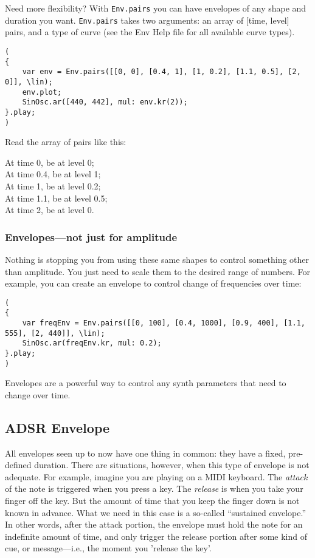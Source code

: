 Need more flexibility? With \texttt{Env.pairs} you can have envelopes of any shape and duration you want. \texttt{Env.pairs} takes two arguments: an array of [time, level] pairs, and a type of curve (see the Env Help file for all available curve types).

 
\begin{lstlisting}[style=SuperCollider-IDE, basicstyle=\scttfamily\footnotesize]
(
{
	var env = Env.pairs([[0, 0], [0.4, 1], [1, 0.2], [1.1, 0.5], [2, 0]], \lin);
	env.plot;
	SinOsc.ar([440, 442], mul: env.kr(2));
}.play;
)
\end{lstlisting}
 

Read the array of pairs like this:
\begin{center}
At time 0, be at level 0;\\
At time 0.4, be at level 1;\\
At time 1, be at level 0.2;\\
At time 1.1, be at level 0.5;\\
At time 2, be at level 0.
\end{center}

\subsubsection{Envelopes---not just for amplitude}

Nothing is stopping you from using these same shapes to control something other than amplitude. You just need to scale them to the desired range of numbers. For example, you can create an envelope to control change of frequencies over time:

\begin{lstlisting}[style=SuperCollider-IDE, basicstyle=\scttfamily\footnotesize]
(
{
	var freqEnv = Env.pairs([[0, 100], [0.4, 1000], [0.9, 400], [1.1, 555], [2, 440]], \lin);
	SinOsc.ar(freqEnv.kr, mul: 0.2);
}.play;
)
\end{lstlisting}

Envelopes are a powerful way to control any synth parameters that need to change over time.

\subsection{ADSR Envelope}

All envelopes seen up to now have one thing in common: they have a fixed, pre-defined duration. There are situations, however, when this type of envelope is not adequate. For example, imagine you are playing on a MIDI keyboard. The \textit{attack} of the note is triggered when you press a key. The \textit{release} is when you take your finger off the key. But the amount of time that you keep the finger down is not known in advance. What we need in this case is a so-called ``sustained envelope.'' In other words, after the attack portion, the envelope must hold the note for an indefinite amount of time, and only trigger the release portion after some kind of cue, or message---i.e., the moment you 'release the key'.

